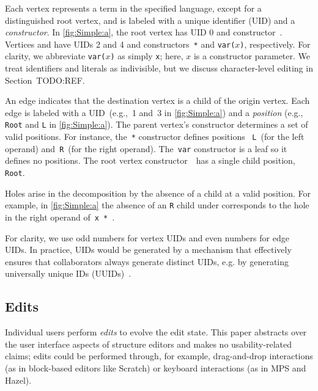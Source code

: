 Each vertex represents a term in the specified language, except for a distinguished root vertex, 
and is labeled with a unique identifier (UID) and a \emph{constructor}. 
In \autoref{fig:Simple:a}, the root vertex has UID 0 and constructor~\textbullet. 
Vertices \vSimpleTimes{} and \vSimpleX{} have UIDs 2 and 4 and constructors~\texttt{*} and \texttt{var(}$x$\texttt{)}, respectively.
For clarity, we abbreviate \texttt{var(}$x$\texttt{)} as simply \texttt{x}; here, $x$ is a constructor parameter. We treat identifiers and literals as indivisible, but we discuss character-level editing in Section~TODO:REF.

An edge indicates that the destination vertex is a child of the origin vertex. 
Each edge is labeled with a UID~(e.g.,~1 and~3 in \autoref{fig:Simple:a})
and a \emph{position} (e.g., \texttt{Root} and \texttt{L} in \autoref{fig:Simple:a}). 
The parent vertex's constructor determines a set of valid {positions}. 
For instance, the~\texttt{*} constructor defines positions
~\texttt{L}~(for the left operand)
and~\texttt{R}~(for the right operand).
The~\texttt{var} constructor is a leaf so it defines no positions.
The root vertex constructor~\textbullet~has a single child position, \texttt{Root}.


Holes arise in the decomposition by the absence of a child at a valid position.
For example, in \autoref{fig:Simple:a} the absence of an \texttt{R} child under \vSimpleTimes{}
corresponds to the hole in the right operand of~\texttt{x * \hole}.

For clarity, we use odd numbers for vertex UIDs and even numbers for edge UIDs. In practice, UIDs would be generated by a mechanism
that effectively ensures that collaborators always generate distinct UIDs, e.g. by generating
universally unique IDs (UUIDs)~\cite{IETF RFC 4122}.


\subsection{Edits}%
\label{sub:Single-User Actions}
\figureWrapMove

Individual users perform \emph{edits} to evolve the edit state. This paper abstracts over the user interface aspects of structure editors and makes no usability-related claims; edits could be performed through, for example, drag-and-drop interactions (as in block-based editors like Scratch) or keyboard interactions (as in MPS and Hazel). %

